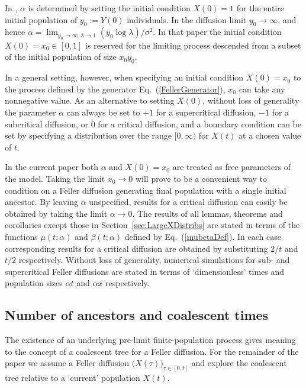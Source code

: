\documentclass[preprint,12pt]{elsarticle}
\begin{document}
In \citet[Eq.~(6)]{BurdenGriffiths24}, $\alpha$ is determined by setting the initial condition $X(0) = 1$ for the entire initial population of 
$y_0 := Y(0)$ individuals.  In the diffusion limit $y_0 \to \infty$, and hence $\alpha = \lim_{y_0 \to \infty, \lambda \to 1} (y_0 \log\lambda)/\sigma^2$.  
In that paper the initial condition $X(0) = x_0 \in [0, 1]$ is reserved 
for the limiting process descended from a subset of the initial population of size $x_0 y_0$.

In a general setting, however, when specifying an initial condition 
$X(0) = x_0$ to the process defined by the generator Eq.~(\ref{FellerGenerator}), $x_0$ can take any nonnegative value.  
As an alternative to setting $X(0)$, without loss of generality the parameter $\alpha$ can always be set to $+1$ for a supercritical diffusion, 
$-1$ for a subcritical diffusion, or $0$ for a critical diffusion, and 
a boundary condition can be set by specifying a distribution over the range $[0, \infty)$ for $X(t)$ at a chosen value of $t$.  

In the current paper both $\alpha$ and $X(0) = x_0$ are treated as free parameters of the model.  Taking the limit $x_0 \to 0$ will prove to be a 
convenient way to condition on a Feller diffusion generating final population with a single initial ancestor.  
By leaving $\alpha$ 
unspecified, results for a critical diffusion can easily be obtained by taking the limit $\alpha \to 0$.  The results of all lemmas, theorems and corollaries 
except those in Section~\ref{sec:LargeXDistribs} are stated in terms of the functions $\mu(t; \alpha)$ and $\beta(t; \alpha)$ 
defined by Eq.~(\ref{mubetaDef}).  In each case corresponding results for a critical diffusion are obtained by substituting $2/t$ and $t/2$ respectively.  
Without loss of generality, numerical simulations for sub- and supercritical Feller diffusions are stated in terms of `dimensionless' times and 
population sizes $\alpha t$ and $\alpha x$ respectively.  

%

\subsection{Number of ancestors and coalescent times}
\label{sec:numberOfAncestors}

The existence of an underlying pre-limit finite-population process gives meaning to the concept of a 
coalescent tree for a Feller diffusion.  For the remainder of the paper we assume a Feller diffusion 
$\big(X(\tau)\big)_{\tau \in [0, t]}$ and explore the coalescent tree relative to a `current'  population $X(t)$.
\end{document}
